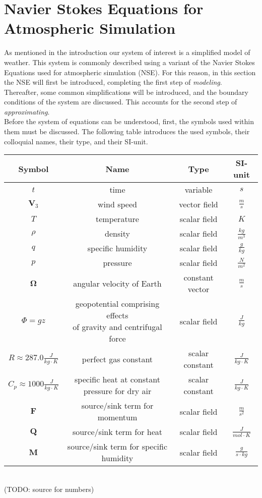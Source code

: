 \chapter{Navier Stokes Equations for Atmospheric Simulation}\label{chapter:navier_stokes}
As mentioned in the introduction our system of interest is a simplified model of weather.
This system is commonly described using a variant of the Navier Stokes Equations used for atmospheric simulation (NSE).
For this reason, in this section the NSE will first be introduced, completing the first step of \emph{modeling}.
Thereafter, some common simplifications will be introduced, and the boundary conditions of the system are discussed.
This accounts for the second step of \emph{approximating}.\\

Before the system of equations can be understood, first, the symbols used within them must be discussed.
The following table introduces the used symbols, their colloquial names, their type, and their SI-unit.

\begin{tabular}{c|c|c|c}
\hline
Symbol & Name & Type & SI-unit \\ 
\hline 
$t$ & time & variable & $s$ \\
\hline 
$\textbf{V}_3$ & wind speed & vector field & $\frac{m}{s}$ \\
\hline 
$T$ & temperature & scalar field & $K$ \\
\hline 
$\rho$ & density & scalar field & $\frac{kg}{m^3}$ \\
\hline 
$q$ & specific humidity & scalar field & $\frac{g}{kg}$ \\
\hline 
$p$ & pressure & scalar field & $\frac{N}{m^2}$ \\
\hline 
$\boldsymbol{\Omega}$ & angular velocity of Earth & constant vector & $\frac{m}{s}$ \\
\hline 
$\Phi = gz$ & \makecell{geopotential comprising effects\\ of gravity and centrifugal force} & scalar field & $\frac{J}{kg}$ \\
\hline 
$R \approx 287.0 \frac{J}{kg\cdot K}$ & perfect gas constant & scalar constant & $\frac{J}{kg\cdot K}$ \\ 
\hline 
$C_p \approx 1000 \frac{J}{kg\cdot K}$ & \makecell{specific heat at constant \\pressure for dry air} & scalar constant & $\frac{J}{kg\cdot K}$ \\ 
\hline 
$\textbf{F}$ & source/sink term for momentum & scalar field & $\frac{m}{s^2}$ \\ 
\hline 
$\textbf{Q}$ & source/sink term for heat & scalar field & $\frac{J}{mol\cdot K}$ \\ 
\hline 
$\textbf{M}$ & source/sink term for specific humidity & scalar field & $\frac{g}{s\cdot kg}$ \\ 
\end{tabular}
\\(TODO: source for numbers)\\

